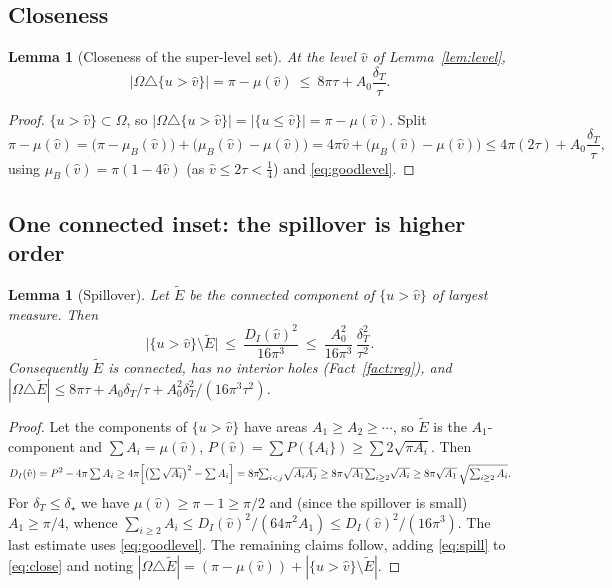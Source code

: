 \documentclass[11pt]{article}
\newtheorem{lemma}[theorem]{Lemma}
\theoremstyle{definition}
\newcommand{\Om}{\Omega}
\newcommand{\dT}{\delta_T}
\newcommand{\Etil}{\widetilde E}
\newcommand{\abs}[1]{\left|#1\right|}
\begin{document}
\subsection{Closeness}\label{sec:close}

\begin{lemma}[Closeness of the super-level set]\label{lem:close}
At the level $\hat v$ of Lemma~\ref{lem:level},
\begin{equation}\label{eq:close}
   \abs{\Om\triangle\{u>\hat v\}}=\pi-\mu(\hat v)\ \le\ 8\pi\tau+A_0\frac{\dT}{\tau}.
\end{equation}
\end{lemma}

\begin{proof}
$\{u>\hat v\}\subset\Om$, so $\abs{\Om\triangle\{u>\hat v\}}=\abs{\{u\le\hat
v\}}=\pi-\mu(\hat v)$. Split
\[
   \pi-\mu(\hat v)=\bigl(\pi-\mu_B(\hat v)\bigr)+\bigl(\mu_B(\hat v)-\mu(\hat v)\bigr)
   =4\pi\hat v+\bigl(\mu_B(\hat v)-\mu(\hat v)\bigr)
   \le4\pi(2\tau)+A_0\frac{\dT}{\tau},
\]
using $\mu_B(\hat v)=\pi(1-4\hat v)$ (as $\hat v\le2\tau<\tfrac14$) and
\eqref{eq:goodlevel}.
\end{proof}

\subsection{One connected inset: the spillover is higher order}\label{sec:spill}

\begin{lemma}[Spillover]\label{lem:spill}
Let $\Etil$ be the connected component of $\{u>\hat v\}$ of largest measure.
Then
\begin{equation}\label{eq:spill}
   \bigl|\{u>\hat v\}\setminus\Etil\bigr|\ \le\ \frac{D_I(\hat v)^2}{16\pi^3}
   \ \le\ \frac{A_0^2}{16\pi^3}\,\frac{\dT^2}{\tau^2}.
\end{equation}
Consequently $\Etil$ is connected, has no interior holes
\textup{(}Fact~\ref{fact:reg}\textup{)}, and
$\abs{\Om\triangle\Etil}\le 8\pi\tau+A_0\dT/\tau+A_0^2\dT^2/(16\pi^3\tau^2)$.
\end{lemma}

\begin{proof}
Let the components of $\{u>\hat v\}$ have areas $A_1\ge A_2\ge\cdots$, so
$\Etil$ is the $A_1$-component and $\sum A_i=\mu(\hat v)$,
$P(\hat v)=\sum P(\{A_i\})\ge\sum 2\sqrt{\pi A_i}$. Then
\[
   D_I(\hat v)=P^2-4\pi\textstyle\sum A_i
   \ge4\pi\Bigl[\bigl(\sum\sqrt{A_i}\bigr)^2-\sum A_i\Bigr]
   =8\pi\!\!\sum_{i<j}\!\sqrt{A_iA_j}
   \ge8\pi\sqrt{A_1}\!\sum_{i\ge2}\!\sqrt{A_i}
   \ge8\pi\sqrt{A_1}\,\sqrt{\textstyle\sum_{i\ge2}A_i}.
\]
For $\dT\le\delta_\star$ we have $\mu(\hat v)\ge\pi-1\ge\pi/2$ and (since the
spillover is small) $A_1\ge\pi/4$, whence
$\sum_{i\ge2}A_i\le D_I(\hat v)^2/(64\pi^2A_1)\le D_I(\hat v)^2/(16\pi^3)$.
The last estimate uses \eqref{eq:goodlevel}. The remaining claims follow,
adding \eqref{eq:spill} to \eqref{eq:close} and noting
$\abs{\Om\triangle\Etil}=(\pi-\mu(\hat v))+\abs{\{u>\hat v\}\setminus\Etil}$.
\end{proof}
\end{document}
